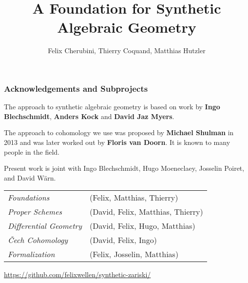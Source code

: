 \documentclass{beamer}
\title[ConCoh]
{A Foundation for Synthetic Algebraic Geometry}
\author[Author, Anders] 
{Felix Cherubini, Thierry Coquand, Matthias Hutzler}
\begin{document}
\date{}
\begin{frame}
  \titlepage
\end{frame}

\begin{frame}
  \frametitle{Acknowledgements and Subprojects}
  The approach to synthetic algebraic geometry is based on work by  \textbf{Ingo Blechschmidt}, \textbf{Anders Kock} and \textbf{David Jaz Myers}.

  \pause
  \vspace{0.25cm}
  The approach to cohomology we use was proposed by \textbf{Michael Shulman} in 2013 and was later worked out by \textbf{Floris van Doorn}.
  It is known to many people in the field.

  \pause
  \vspace{0.5cm}
  Present work is joint with
  Ingo Blechschmidt,
  Hugo Moeneclaey,
  Josselin Poiret, and
  David Wärn.

  \vspace{0.25cm}
  \begin{tabular}{lp{7.5cm}}
    \textit{Foundations} & (Felix, Matthias, Thierry) \\
    \textit{Proper Schemes} & (David, Felix, Matthias, Thierry) \\
    \textit{Differential Geometry} & (David, Felix, Hugo, Matthias) \\
    \textit{\v{C}ech Cohomology} & (David, Felix, Ingo) \\
    \textit{Formalization} & (Felix, Josselin, Matthias) \\
  \end{tabular}

  \vspace{0.25cm}
  \url{https://github.com/felixwellen/synthetic-zariski/}
\end{frame}
\end{document}
